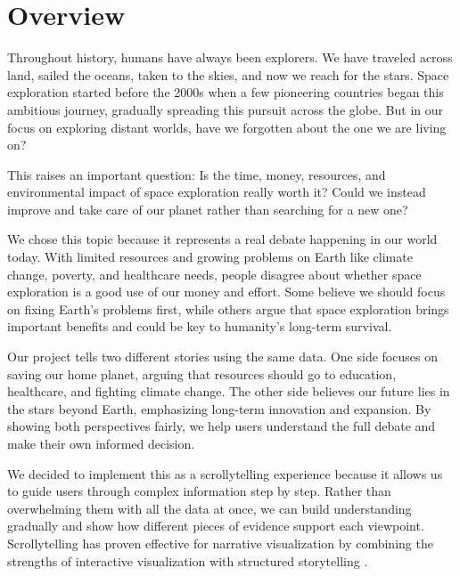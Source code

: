 \documentclass[sigconf]{acmart}
\begin{document}
\maketitle

\makeatletter
\fancyfoot[RO,LE]{}  %
\makeatother

\section{Overview}

Throughout history, humans have always been explorers. We have traveled across land, sailed the oceans, taken to the skies, and now we reach for the stars. Space exploration started before the 2000s when a few pioneering countries began this ambitious journey, gradually spreading this pursuit across the globe. But in our focus on exploring distant worlds, have we forgotten about the one we are living on?

This raises an important question: Is the time, money, resources, and environmental impact of space exploration really worth it? Could we instead improve and take care of our planet rather than searching for a new one?

We chose this topic because it represents a real debate happening in our world today. With limited resources and growing problems on Earth like climate change, poverty, and healthcare needs, people disagree about whether space exploration is a good use of our money and effort. Some believe we should focus on fixing Earth's problems first, while others argue that space exploration brings important benefits and could be key to humanity's long-term survival.

Our project tells two different stories using the same data. One side focuses on saving our home planet, arguing that resources should go to education, healthcare, and fighting climate change. The other side believes our future lies in the stars beyond Earth, emphasizing long-term innovation and expansion. By showing both perspectives fairly, we help users understand the full debate and make their own informed decision.

We decided to implement this as a scrollytelling experience because it allows us to guide users through complex information step by step. Rather than overwhelming them with all the data at once, we can build understanding gradually and show how different pieces of evidence support each viewpoint. Scrollytelling has proven effective for narrative visualization by combining the strengths of interactive visualization with structured storytelling \cite{SatyanariyanaScrollytelling}.
\end{document}
